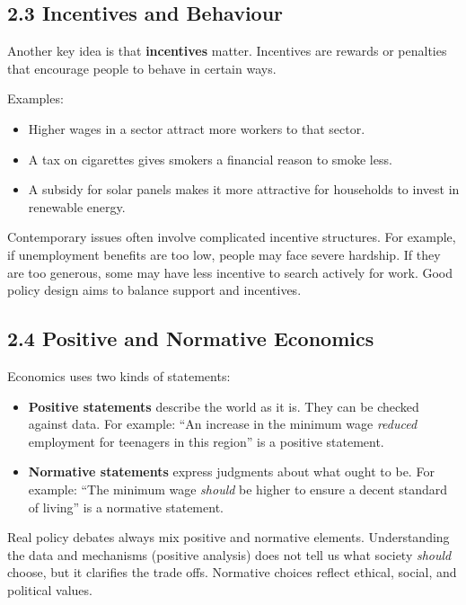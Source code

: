 \documentclass[12pt]{article}
\begin{document}
\subsection*{2.3 Incentives and Behaviour}

Another key idea is that \textbf{incentives} matter. Incentives are rewards or penalties that encourage people to behave in certain ways.

Examples:

\begin{itemize}[noitemsep]
    \item Higher wages in a sector attract more workers to that sector.
    \item A tax on cigarettes gives smokers a financial reason to smoke less.
    \item A subsidy for solar panels makes it more attractive for households to invest in renewable energy.
\end{itemize}

Contemporary issues often involve complicated incentive structures. For example, if unemployment benefits are too low, people may face severe hardship. If they are too generous, some may have less incentive to search actively for work. Good policy design aims to balance support and incentives.

\subsection*{2.4 Positive and Normative Economics}

Economics uses two kinds of statements:

\begin{itemize}[noitemsep]
    \item \textbf{Positive statements} describe the world as it is. They can be checked against data. For example: ``An increase in the minimum wage \emph{reduced} employment for teenagers in this region'' is a positive statement.
    \item \textbf{Normative statements} express judgments about what ought to be. For example: ``The minimum wage \emph{should} be higher to ensure a decent standard of living'' is a normative statement.
\end{itemize}

Real policy debates always mix positive and normative elements. Understanding the data and mechanisms (positive analysis) does not tell us what society \emph{should} choose, but it clarifies the trade offs. Normative choices reflect ethical, social, and political values.
\end{document}

